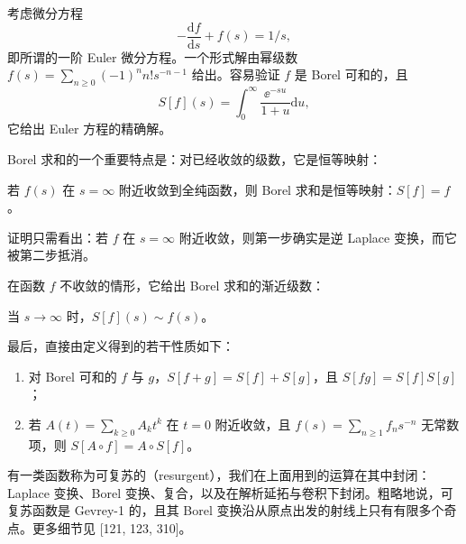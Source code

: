 \begin{example}[16.11] 考虑微分方程
\[
-\frac{\mathrm{d}f}{\mathrm{d}s}+f(s)=1/s,
\]
即所谓的一阶 Euler 微分方程。一个形式解由幂级数 $f(s)=\sum_{n\ge0}(-1)^nn!s^{-n-1}$ 给出。容易验证 $f$ 是 Borel 可和的，且
\[
S[f](s)=\int_0^\infty\frac{\ee^{-su}}{1+u}\mathrm{d}u,
\]
它给出 Euler 方程的精确解。\end{example}


Borel 求和的一个重要特点是：对已经收敛的级数，它是恒等映射：

\begin{proposition}[16.12] 若 $f(s)$ 在 $s=\infty$ 附近收敛到全纯函数，则 Borel 求和是恒等映射：$S[f]=f$。\end{proposition}

证明只需看出：若 $f$ 在 $s=\infty$ 附近收敛，则第一步确实是逆 Laplace 变换，而它被第二步抵消。

在函数 $f$ 不收敛的情形，它给出 Borel 求和的渐近级数：

\begin{proposition}[16.13（{{[216, Prop. 2.11(b)]}}）] 当 $s\to\infty$ 时，$S[f](s)\sim f(s)$。\end{proposition}

最后，直接由定义得到的若干性质如下：

\begin{proposition}[16.14（{{[216, Prop. 2.11(a, c)]}}）]
\begin{enumerate}
  \item 对 Borel 可和的 $f$ 与 $g$，$S[f+g]=S[f]+S[g]$，且 $S[fg]=S[f]S[g]$；
  \item 若 $A(t)=\sum_{k\ge0}A_kt^k$ 在 $t=0$ 附近收敛，且 $f(s)=\sum_{n\ge1}f_ns^{-n}$ 无常数项，则 $S[A\circ f]=A\circ S[f]$。
\end{enumerate}
\end{proposition}

\begin{remark}[16.15] 有一类函数称为可复苏的（resurgent），我们在上面用到的运算在其中封闭：Laplace 变换、Borel 变换、复合，以及在解析延拓与卷积下封闭。粗略地说，可复苏函数是 Gevrey-1 的，且其 Borel 变换沿从原点出发的射线上只有有限多个奇点。更多细节见 [121, 123, 310]。\end{remark}

